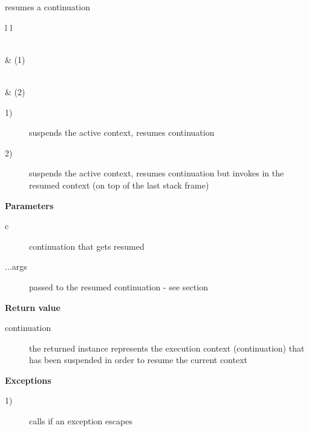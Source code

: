 
resumes a continuation\\

\begin{tabular}{ l l }
    \midrule

    \\
     & (1)\\

    \midrule

    \\
     & (2)\\

    \midrule
\end{tabular}

\begin{description}
    \item[1)] suspends the active context, resumes continuation 
    \item[2)] suspends the active context, resumes continuation  but
              invokes  in the resumed context (on top of the
              last stack frame)
\end{description}

{\bfseries Parameters}
\begin{description}
    \item[c]       continuation that gets resumed
    \item[...args] passed to the resumed continuation - see section
                   \\
\end{description}

{\bfseries Return value}
\begin{description}
    \item[continuation] the returned instance represents the execution context
                        (continuation) that has been suspended in order to
                        resume the current context
\end{description}

{\bfseries Exceptions}
\begin{description}
    \item[1)] calls  if an exception escapes \entryfn
              \\
\end{description}

